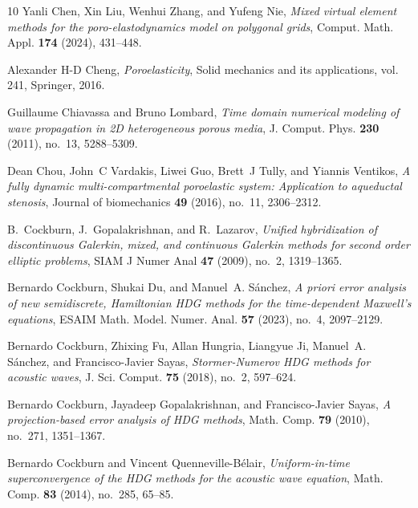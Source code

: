 \documentclass[10pt,letterpaper]{amsart}
\theoremstyle{plain} %
\theoremstyle{remark} %
\begin{document}
\begin{thebibliography}{10}
Yanli Chen, Xin Liu, Wenhui Zhang, and Yufeng Nie, \emph{Mixed virtual element
  methods for the poro-elastodynamics model on polygonal grids}, Comput. Math.
  Appl. \textbf{174} (2024), 431--448. 

Alexander H-D Cheng, \emph{Poroelasticity}, Solid mechanics and its
  applications, vol. 241, Springer, 2016.

Guillaume Chiavassa and Bruno Lombard, \emph{Time domain numerical modeling of
  wave propagation in 2{D} heterogeneous porous media}, J. Comput. Phys.
  \textbf{230} (2011), no.~13, 5288--5309. 

Dean Chou, John~C Vardakis, Liwei Guo, Brett~J Tully, and Yiannis Ventikos,
  \emph{A fully dynamic multi-compartmental poroelastic system: Application to
  aqueductal stenosis}, Journal of biomechanics \textbf{49} (2016), no.~11,
  2306--2312.

B.~Cockburn, J.~Gopalakrishnan, and R.~Lazarov, \emph{Unified hybridization of
  discontinuous {G}alerkin, mixed, and continuous {G}alerkin methods for second
  order elliptic problems}, SIAM J Numer Anal \textbf{47} (2009), no.~2,
  1319--1365.

Bernardo Cockburn, Shukai Du, and Manuel~A. S\'anchez, \emph{{\it {A} priori}
  error analysis of new semidiscrete, {H}amiltonian {HDG} methods for the
  time-dependent {M}axwell's equations}, ESAIM Math. Model. Numer. Anal.
  \textbf{57} (2023), no.~4, 2097--2129. 

Bernardo Cockburn, Zhixing Fu, Allan Hungria, Liangyue Ji, Manuel~A. S\'anchez,
  and Francisco-Javier Sayas, \emph{Stormer-{N}umerov {HDG} methods for
  acoustic waves}, J. Sci. Comput. \textbf{75} (2018), no.~2, 597--624.

Bernardo Cockburn, Jayadeep Gopalakrishnan, and Francisco-Javier Sayas, \emph{A
  projection-based error analysis of {HDG} methods}, Math. Comp. \textbf{79}
  (2010), no.~271, 1351--1367. 

Bernardo Cockburn and Vincent Quenneville-B\'elair, \emph{Uniform-in-time
  superconvergence of the {HDG} methods for the acoustic wave equation}, Math.
  Comp. \textbf{83} (2014), no.~285, 65--85. 


\end{thebibliography}
\end{document}
